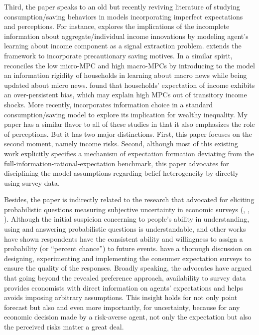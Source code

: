Third, the paper
speaks to an old but recently reviving literature of studying
consumption/saving behaviors in models incorporating imperfect
expectations and perceptions. For instance, \cite{pischke1995individual} explores the implications of the
incomplete information about aggregate/individual income innovations by modeling agent's learning about income component as a signal extraction problem. \cite{wang2004precautionary} extends the framework to incorporate precautionary saving motives. In a similar spirit, \cite{carroll_sticky_2018} reconciles the low micro-MPC and high macro-MPCs by introducing to the model an information rigidity of households in learning about macro news while being updated about micro news. \cite{rozsypal_overpersistence_2017} found that households' expectation of income exhibits an over-persistent bias, which may explain high MPCs out of transitory income shocks. More recently, \cite{broer2021information} incorporates information choice in a standard consumption/saving model to explore its implication for wealthy inequality. My paper has a similar flavor to all of these studies in that it also emphasizes the role of perceptions. But it has two major distinctions. First, this paper focuses on the second moment, namely income risks. Second, although most of this existing work explicitly specifies a mechanism of expectation formation deviating from the full-information-rational-expectation benchmark, this paper advocates for disciplining the model assumptions regarding belief heterogeneity by directly using survey data. 



Besides, the paper is indirectly related to the research that advocated
for eliciting probabilistic questions measuring subjective uncertainty
in economic surveys (\cite{manski_measuring_2004},
\cite{delavande2011measuring}, \cite{manski_survey_2018}). Although the
initial suspicion concerning to people's ability in understanding, using
and answering probabilistic questions is understandable,
\cite{bertrand_people_2001} and other works have shown respondents have
the consistent ability and willingness to assign a probability (or
``percent chance'') to future events. \cite{armantier_overview_2017}
have a thorough discussion on designing, experimenting and implementing
the consumer expectation surveys to ensure the quality of the responses.
Broadly speaking, the advocates have argued that going beyond the
revealed preference approach, availability to survey data provides
economists with direct information on agents' expectations and helps
avoids imposing arbitrary assumptions. This insight holds for not only
point forecast but also and even more importantly, for uncertainty,
because for any economic decision made by a risk-averse agent, not only
the expectation but also the perceived risks matter a great deal.

